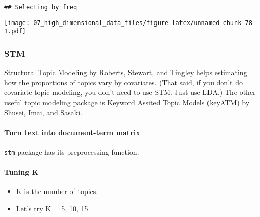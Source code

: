 \documentclass[
]{book}
\newenvironment{Shaded}{\begin{snugshade}}{\end{snugshade}}
\newcommand{\AttributeTok}[1]{\textcolor[rgb]{0.77,0.63,0.00}{#1}}
\newcommand{\ConstantTok}[1]{\textcolor[rgb]{0.00,0.00,0.00}{#1}}
\newcommand{\FunctionTok}[1]{\textcolor[rgb]{0.00,0.00,0.00}{#1}}
\newcommand{\NormalTok}[1]{#1}
\newcommand{\OtherTok}[1]{\textcolor[rgb]{0.56,0.35,0.01}{#1}}
\newcommand{\SpecialCharTok}[1]{\textcolor[rgb]{0.00,0.00,0.00}{#1}}
\providecommand{\tightlist}{%
  \setlength{\itemsep}{0pt}\setlength{\parskip}{0pt}}
\begin{document}
\begin{verbatim}
## Selecting by freq
\end{verbatim}

\texttt{[image: 07\_high\_dimensional\_data\_files/figure-latex/unnamed-chunk-78-1.pdf]}

\hypertarget{stm}{%
\subsubsection{STM}\label{stm}}

\href{https://www.structuraltopicmodel.com/}{Structural Topic Modeling} by Roberts, Stewart, and Tingley helps estimating how the proportions of topics vary by covariates. (That said, if you don't do covariate topic modeling, you don't need to use STM. Just use LDA.) The other useful topic modeling package is Keyword Assited Topic Models (\href{https://keyatm.github.io/keyATM/}{keyATM}) by Shusei, Imai, and Sasaki.

\hypertarget{turn-text-into-document-term-matrix}{%
\paragraph{Turn text into document-term matrix}\label{turn-text-into-document-term-matrix}}

\texttt{stm} package has its preprocessing function.

\begin{Shaded}
\end{Shaded}

\hypertarget{tuning-k}{%
\paragraph{Tuning K}\label{tuning-k}}

\begin{itemize}
\tightlist
\item
  K is the number of topics.
\item
  Let's try K = 5, 10, 15.
\end{itemize}
\end{document}
